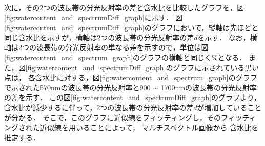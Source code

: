 次に，その2つの波長帯の分光反射率の差と含水比を比較したグラフを，図\ref{fig:watercontent_and_spectrumDiff_graph}に示す．
図\ref{fig:watercontent_and_spectrumDiff_graph}のグラフにおいて，縦軸は先ほどと同じ含水比を示すが，横軸は2つの波長帯の分光反射率の差$d$を示す．
なお，横軸は2つの波長帯の分光反射率の単なる差を示すので，単位は図\ref{fig:watercontent_and_spectrum_graph}のグラフの横軸と同じく$\%$となる．
また，図\ref{fig:watercontent_and_spectrumDiff_graph}のグラフに示されている黒い点は，
各含水比に対する，図\ref{fig:watercontent_and_spectrum_graph}のグラフで示された570nmの波長帯の分光反射率と900 $\sim$ 1700nmの波長帯の分光反射率の差を示す．
この図\ref{fig:watercontent_and_spectrumDiff_graph}のグラフより，含水比が減少するに伴って，2つの波長帯の分光反射率の差$d$が増加していることが分かる．
そこで，このグラフに近似線をフィッティングし，そのフィッティングされた近似線を用いることによって，
マルチスペクトル画像から
含水比を推定する．

